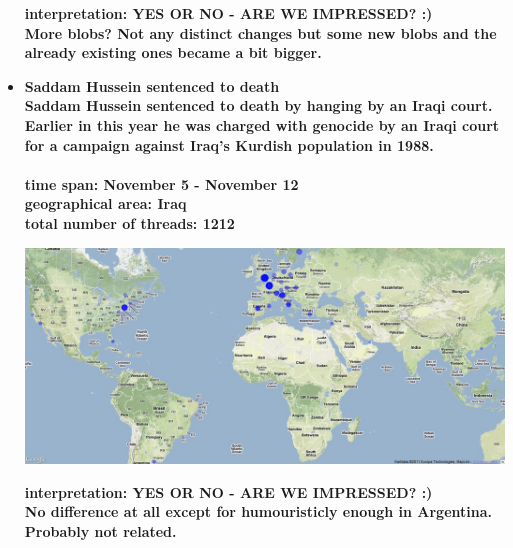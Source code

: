 \documentclass[11pt,a4paper,english]{article}
\begin{document}
\begin{itemize}
						\bf interpretation: \rm YES OR NO - ARE WE IMPRESSED? :)
						\\ More blobs? Not any distinct changes but some new blobs and the already existing ones became a bit bigger.
						
						
					
					\item \bf Saddam Hussein sentenced to death \rm
						\\ Saddam Hussein sentenced to death by hanging by an Iraqi court. Earlier in this year he was charged with genocide by an Iraqi court for a campaign against Iraq's Kurdish population in 1988.
					\\\\ \bf time span: \rm November 5 - November 12
					\\ \bf geographical area: \rm Iraq
					\\ \bf total number of threads: \rm 1212
						
					\includegraphics[width=130mm]{img/post-saddam}
						
					\bf interpretation: \rm YES OR NO - ARE WE IMPRESSED? :)
					\\ No difference at all except for humouristicly enough in Argentina. Probably not related.
						
						
							
				\end{itemize}
			
\end{document}
